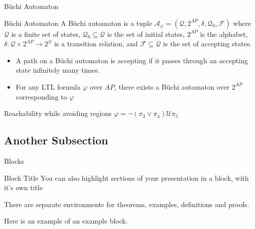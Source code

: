 \documentclass{beamer}
\newcommand{\U}{\bm{\mathcal{U}}}
\begin{document}
\begin{frame}{B\"uchi Automaton}
\begin{block}{B\"uchi Automaton}
	\small A B\"uchi automaton is a tuple $\mathcal{A}_\varphi = (\mathcal{Q},2^{AP},\delta,\mathcal{Q}_0,\mathcal{F})$ where $\mathcal{Q}$ is a finite set of states, $\mathcal{Q}_0 \subseteq \mathcal{Q}$ is the set of initial states, $2^{AP}$ is the alphabet, $\delta: \mathcal{Q} \times 2^{AP} \rightarrow 2^\mathcal{Q}$ is a transition relation, and $\mathcal{F} \subseteq \mathcal{Q}$ is the set of accepting states.
	\end{block}

	\begin{itemize}
	\item {
	A path on a B\"uchi automaton is accepting if it passes through an accepting state infinitely many times.
	}
	\item {
	For any LTL formula $\varphi$ over $AP$, there exists a B\"uchi automaton over $2^{AP}$ corresponding to $\varphi$ \cite{baier08}
	}
	\end{itemize}
	Reachability while avoiding regions $\varphi = \neg(\pi_3 \lor \pi_4) \U \pi_5$
	
	\begin{figure}
\centering
{}
\end{figure}
\end{frame}


\subsection{Another Subsection}

\begin{frame}{Blocks}
\begin{block}{Block Title}
You can also highlight sections of your presentation in a block, with it's own title
\end{block}
\begin{theorem}
There are separate environments for theorems, examples, definitions and proofs.
\end{theorem}
\begin{example}
Here is an example of an example block.
\end{example}
\end{frame}
\end{document}
